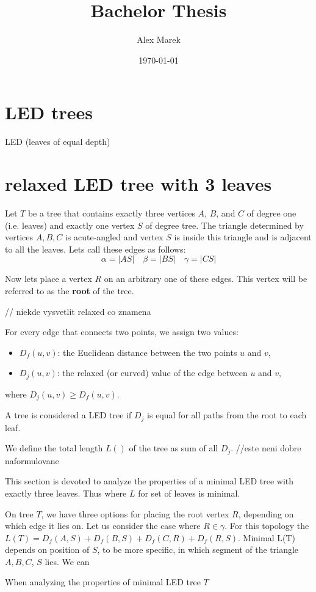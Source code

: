 \documentclass[12pt]{article}
\title{Bachelor Thesis}
\author{Alex Marek}
\date{\today}
\begin{document}
	
	\maketitle
	
	\section*{LED trees}
	LED (leaves of equal depth)
	
	\maketitle
	
	\section*{relaxed LED tree with 3 leaves}
	
	Let \( T \) be a tree that contains exactly three vertices \( A \), \( B \), and \( C \) of degree one (i.e. leaves) and exactly one vertex \( S \) of degree tree.
	The triangle determined by vertices \( A , B , C \) is acute-angled and vertex \( S \) is inside this triangle and is adjacent to all the leaves. 
	Lets call these edges as follows:
	\[
	\alpha = |AS| \quad \beta = |BS| \quad \gamma = |CS|
	\]
		

	Now lets place a vertex \( R \) on an arbitrary one of these edges. This vertex will be referred to as the \textbf{root} of the tree.

	// niekde vysvetlit relaxed co znamena
	
	For every edge that connects two points, we assign two values:
	\begin{itemize}
	\item \( D_f(u, v) \): the Euclidean distance between the two points \( u \) and \( v \),
	\item \( D_j(u, v) \): the relaxed (or curved) value of the edge between \( u \) and \( v \),
	\end{itemize}
	where \( D_j(u, v) \geq D_f(u, v) \).
 	
	A tree is considered a LED tree if \( D_j \) is equal for all paths from the root to each leaf.
	
	We define the total length \( L() \) of the tree as sum of all \( D_j \). //este neni dobre naformulovane 
	
	This section is devoted to analyze the properties of a minimal LED tree with exactly three leaves.
 	Thus where \( L \) for set of leaves is minimal.
 	
	On tree \( T \), we have three options for placing the root vertex \( R \), depending on which edge it lies on. Let us consider the case where \( R \in \gamma \). For this topology the \( L(T) = D_f(A, S) + D_f(B, S) + D_f(C, R) + D_f(R, S) \). Minimal L(T) depends on position of \( S \), to be more specific, in which segment of the triangle \( A , B , C \), \(S\) lies. We can    
	
	
	When analyzing the properties of minimal LED tree \( T \)  
\end{document}
